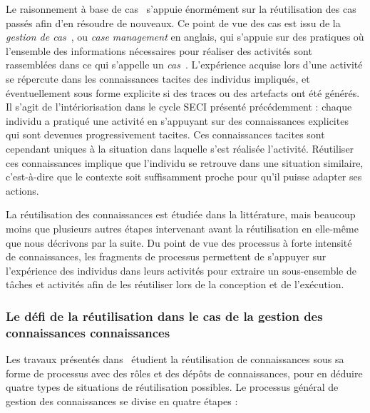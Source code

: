 Le raisonnement à base de cas~\cite{slade1991case}\cite{kolodner1992introduction} s'appuie énormément sur la réutilisation des cas passés afin d'en résoudre de nouveaux.
Ce point de vue des cas est issu de la \textit{gestion de cas}~\cite{davenport1994case}\cite{van2005case}\cite{swenson2013white}, ou \textit{case management} en anglais, qui s'appuie sur des pratiques où l'ensemble des informations nécessaires pour réaliser des activités sont rassemblées dans ce qui s'appelle un \textit{cas}~\cite{swenson2013white}.
L'expérience acquise lors d'une activité se répercute dans les connaissances tacites des individus impliqués, et éventuellement sous forme explicite si des traces ou des artefacts ont été générés.
Il s'agit de l'intériorisation dans le cycle SECI présenté précédemment : chaque individu a pratiqué une activité en s'appuyant sur des connaissances explicites qui sont devenues progressivement tacites.
Ces connaissances tacites sont cependant uniques à la situation dans laquelle s'est réalisée l'activité.
Réutiliser ces connaissances implique que l'individu se retrouve dans une situation similaire, c'est-à-dire que le contexte soit suffisamment proche pour qu'il puisse adapter ses actions.

La réutilisation des connaissances est étudiée dans la littérature, mais beaucoup moins que plusieurs autres étapes intervenant avant la réutilisation en elle-même~\cite{schacht2016methodology} que nous décrivons par la suite.
Du point de vue des processus à forte intensité de connaissances, les fragments de processus permettent de s'appuyer sur l'expérience des individus dans leurs activités pour extraire un sous-ensemble de tâches et activités afin de les réutiliser lors de la conception et de l'exécution.


\bigskip


\subsubsection{Le défi de la réutilisation dans le cas de la gestion des connaissances connaissances}
\label{subsubsection:Contexte:KIP-RevueLitterature:ReutilisationKIP:KM}


Les travaux présentés dans~\cite{markus2001toward} étudient la réutilisation de connaissances sous sa forme de processus avec des rôles et des dépôts de connaissances, pour en déduire quatre types de situations de réutilisation possibles.
Le processus général de gestion des connaissances se divise en quatre étapes :

